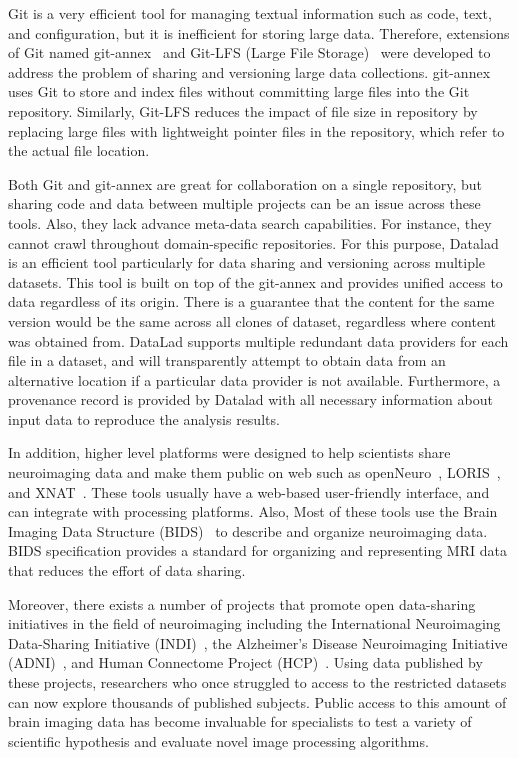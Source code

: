 Git is a very efficient tool for managing textual information such as 
code, text, and configuration, but it is inefficient for storing large 
data. Therefore, extensions of Git named git-annex~\cite{git-annex} 
and Git-LFS (Large File Storage)~\cite{git-lfs} were developed to 
address the problem of sharing and versioning large data collections. 
git-annex uses Git to store and index files without committing large 
files into the Git repository. Similarly, Git-LFS reduces the impact of 
file size in repository by replacing large files with lightweight 
pointer files in the repository, which refer to the actual file 
location. 

Both Git and git-annex are great for collaboration on a single 
repository, but sharing code and data between multiple projects can be an 
issue across these tools. Also, they lack advance meta-data search 
capabilities. For instance, they cannot crawl throughout domain-specific repositories.
 For this purpose, Datalad~\cite{datalad} is an 
efficient tool particularly for data sharing and versioning across 
multiple datasets. This tool is built on top of the git-annex and provides 
unified access to data regardless of its origin. There is a guarantee 
that the content for the same version would be the same across all 
clones of dataset, regardless where content was obtained from. 
DataLad supports multiple redundant data providers for each file in a 
dataset, and will transparently attempt to obtain data from an 
alternative location if a particular data provider is not available. 
Furthermore, a provenance record is provided by Datalad with all 
necessary information about input data to reproduce the analysis 
results. 

In addition, higher level platforms were designed to help 
scientists share neuroimaging data and make them public on web such as 
openNeuro~\cite{gorgolewski2017openneuro}, LORIS~\cite{das2012loris}, 
and XNAT~\cite{marcus2007extensible}. 
These tools usually have a web-based user-friendly interface, and can 
integrate with processing platforms. Also, Most of these tools use the 
Brain Imaging Data Structure (BIDS)~\cite{gorgolewski2016brain} to 
describe and organize neuroimaging data. BIDS specification provides a 
standard for organizing and representing MRI data that reduces the 
effort of data sharing. 

Moreover, there exists a number of projects that promote open 
data-sharing initiatives in the field of neuroimaging including the 
International Neuroimaging Data-Sharing Initiative 
(INDI)~\cite{mennes2013making, milham2012open}, the Alzheimer’s Disease 
Neuroimaging Initiative (ADNI)~\cite{jack2008alzheimer}, and Human 
Connectome Project (HCP)~\cite{van2012human}. Using data published by 
these projects, researchers who once struggled to access to the 
restricted datasets can now explore thousands of published subjects. 
Public access to this amount of brain imaging data has become 
invaluable for specialists to test a variety of scientific hypothesis 
and evaluate novel image processing algorithms. 


